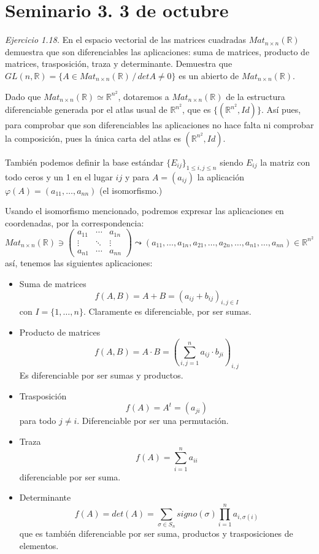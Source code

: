 \section{Seminario 3. 3 de octubre}
\begin{ejer} [2]
    \textit{Ejercicio 1.18.} En el espacio vectorial de las matrices cuadradas $Mat_{n\times n}(\mathbb R)$ demuestra que son diferenciables las aplicaciones: suma de matrices, producto de
    matrices, trasposici\'on, traza y determinante. Demuestra que $GL(n, \mathbb R) = \{A \in Mat_{n\times n}(\mathbb R) \, / \, det A \neq 0 \}$ es un abierto de $Mat_{n\times n}(\mathbb R)$.
\end{ejer}
\begin{sol}
    Dado que $Mat_{n \times n}(\mathbb R) \simeq \mathbb R^{n^2}$, dotaremos a $Mat_{n \times n}(\mathbb R)$ de la estructura diferenciable generada por el atlas usual de $\mathbb R^{n^2}$, que es $\{(\mathbb R^{n^2}, Id)\}$. As\'i pues, para comprobar que son diferenciables las aplicaciones no hace falta ni comprobar la composici\'on, pues la \'unica carta del atlas es $(\mathbb R^{n^2}, Id)$. 

    Tambi\'en podemos definir la base est\'andar $\{E_{ij}\}_{1\leq i,j \leq n}$ siendo $E_{ij}$ la matriz con todo ceros y un 1 en el lugar $ij$ y para $A=(a_{ij})$ la aplicaci\'on $\varphi(A)=(a_{11}, \ldots, a_{nn})$ (el isomorfismo.)
    
    Usando el isomorfismo mencionado, podremos expresar las aplicaciones en coordenadas, por la correspondencia:
    $$Mat_{n \times n}(\mathbb R)  \ni\begin{pmatrix} a_{11} & \cdots & a_{1n} \\ \vdots & \ddots & \vdots \\ a_{n1} & \cdots & a_{nn} 
    \end{pmatrix} \leadsto (a_{11}, \ldots, a_{1n}, a_{21},  \ldots,  a_{2n}, \ldots, a_{n1}, \ldots, a_{nn} ) \in \mathbb R^{n^2}$$
    as\'i, tenemos las siguientes aplicaciones:
    \begin{itemize}
        \item Suma de matrices
        $$f(A,B) = A+B = (a_{ij} + b_{ij})_{i,j \in I}$$
        con $I=\{1, \ldots, n\}$. Claramente es diferenciable, por ser sumas.
        \item Producto de matrices
        $$f(A,B) = A \cdot B= (\sum_{i,j=1}^n a_{ij} \cdot b_{ji})_{i,j}$$
        Es diferenciable por ser sumas y productos.
        \item Trasposici\'on
        $$f(A)=A^t = (a_{ji})$$
        para todo $j \neq i$. Diferenciable por ser una permutaci\'on.
        \item Traza
        $$f(A)=\sum_{i=1}^n a_{ii}$$
        diferenciable por ser suma.
        \item Determinante
        $$f(A)=det(A)= \sum_{\sigma \in S_n} signo(\sigma) \prod_{i=1}^n a_{i, \sigma(i)}$$
        que es tambi\'en diferenciable por ser suma, productos y trasposiciones de elementos. 
        

\end{itemize}
\end{sol}
